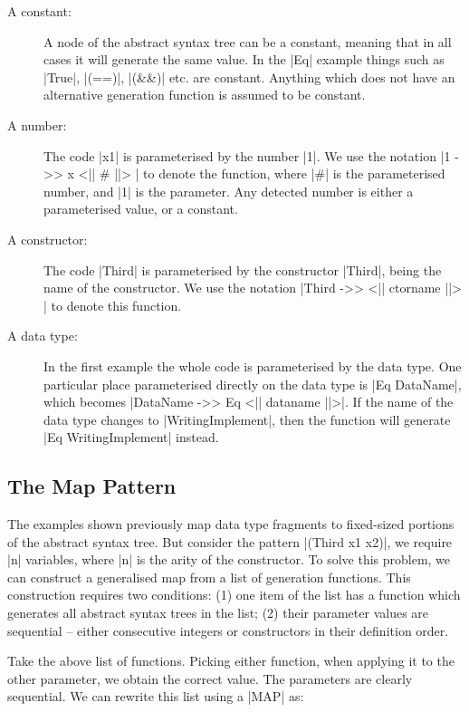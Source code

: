 \documentclass{llncs}
\begin{document}
\begin{description}
\item[A constant:] A node of the abstract syntax tree can be a constant, meaning that in all cases it will generate the same value. In the |Eq| example things such as |True|, |(==)|, |(&&)| etc. are constant. Anything which does not have an alternative generation function is assumed to be constant.

\item[A number:] The code |x1| is parameterised by the number |1|. We use the notation |1 ->> x <|| # ||> | to denote the function, where |#| is the parameterised number, and |1| is the parameter. Any detected number is either a parameterised value, or a constant.

\item[A constructor:] The code |Third| is parameterised by the constructor |Third|, being the name of the constructor. We use the notation |Third ->> <|| ctorname ||> | to denote this function.

\item[A data type:] In the first example the whole code is parameterised by the data type. One particular place parameterised directly on the data type is |Eq DataName|, which becomes |DataName ->> Eq \? <|| dataname ||>|. If the name of the data type changes to |WritingImplement|, then the function will generate |Eq WritingImplement| instead.
\end{description}

\subsection{The Map Pattern}
\label{sec:induction}

The examples shown previously map data type fragments to fixed-sized portions of the abstract syntax tree. But consider the pattern |(Third x1 x2)|, we require |n| variables, where |n| is the arity of the constructor. To solve this problem, we can construct a generalised map from a list of generation functions. This construction requires two conditions: (1) one item of the list has a function which generates all abstract syntax trees in the list; (2) their parameter values are sequential -- either consecutive integers or constructors in their definition order.

\begin{code}
[1 ->> x <| # |>, 2 ->> x <| # |>]
\end{code}

Take the above list of functions. Picking either function, when applying it to the other parameter, we obtain the correct value. The parameters are clearly sequential. We can rewrite this list using a |MAP| as:
\end{document}
